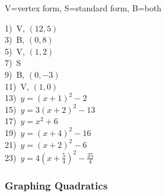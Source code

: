 \documentclass[12pt]{book}
\theoremstyle{definition}
\begin{document}
V=vertex form, S=standard form, B=both
\begin{multicols}{3}
  1)~V, $(12,5)$\\%
  3)~B, $(0,8)$\\%
  5)~V, $(1,2)$\\%
  7)~S\\%
  9)~B, $(0,-3)$\\%
  11)~V, $(1,0)$\\%
  13)~$y=(x+1)^2-2$\\
  15)~$y=3(x+2)^2-13$\\
  17)~$y=x^2+6$\\
  19)~$y=(x+4)^2-16$\\
  21)~$y=(x+2)^2-6$\\
  23)~$y=4\left(x+\frac{5}{4}\right)^2-\frac{25}{4}$%
\end{multicols}

\subsubsection{Graphing Quadratics}
\end{document}
